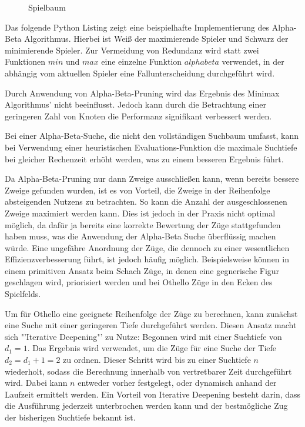 \begin{figure}[]
    \centering
    \caption{Spielbaum}
    \label{fig:game_tree_ab_pruning}
\end{figure}

Das folgende Python Listing zeigt eine beispielhafte Implementierung des Alpha-Beta Algorithmus. Hierbei ist Weiß der
maximierende Spieler und Schwarz der minimierende Spieler. Zur Vermeidung von Redundanz wird statt zwei Funktionen $min$
und $max$ eine einzelne Funktion $alphabeta$ verwendet, in der abhängig vom aktuellen Spieler eine Fallunterscheidung
durchgeführt wird.



Durch Anwendung von Alpha-Beta-Pruning wird das Ergebnis des Minimax Algorithmus' nicht beeinflusst. Jedoch kann durch
die Betrachtung einer geringeren Zahl von Knoten die Performanz signifikant verbessert werden.

Bei einer Alpha-Beta-Suche, die nicht den vollständigen Suchbaum umfasst, kann bei Verwendung einer heuristischen
Evaluations-Funktion die maximale Suchtiefe bei gleicher Rechenzeit erhöht werden, was zu einem besseren Ergebnis führt.

Da Alpha-Beta-Pruning nur dann Zweige ausschließen kann, wenn bereits bessere Zweige gefunden wurden, ist es von
Vorteil, die Zweige in der Reihenfolge absteigenden Nutzens zu betrachten. So kann die Anzahl der ausgeschlossenen
Zweige maximiert werden kann. Dies ist jedoch in der Praxis nicht optimal möglich, da dafür ja bereits eine korrekte
Bewertung der Züge stattgefunden haben muss, was die Anwendung der Alpha-Beta Suche überflüssig machen würde. Eine
ungefähre Anordnung der Züge, die dennoch zu einer wesentlichen Effizienzverbesserung führt, ist jedoch häufig möglich.
Beispielsweise können in einem primitiven Ansatz beim Schach Züge, in denen eine gegnerische Figur geschlagen wird,
priorisiert werden und bei Othello Züge in den Ecken des Spielfelds.

Um für Othello eine geeignete Reihenfolge der Züge zu berechnen, kann zunächst eine Suche mit einer geringeren Tiefe
durchgeführt werden. Diesen Ansatz macht sich "'Iterative Deepening"' zu Nutze: Begonnen wird mit einer Suchtiefe von
$d_1=1$. Das Ergebnis wird verwendet, um die Züge für eine Suche der Tiefe $d_2=d_1+1=2$ zu ordnen. Dieser Schritt wird
bis zu einer Suchtiefe $n$ wiederholt, sodass die Berechnung innerhalb von vertretbarer Zeit durchgeführt wird. Dabei
kann $n$ entweder vorher festgelegt, oder dynamisch anhand der Laufzeit ermittelt werden. Ein Vorteil von Iterative
Deepening besteht darin, dass die Ausführung jederzeit unterbrochen werden kann und der bestmögliche Zug der bisherigen
Suchtiefe bekannt ist.
\cite{alphabetaefficiency}

